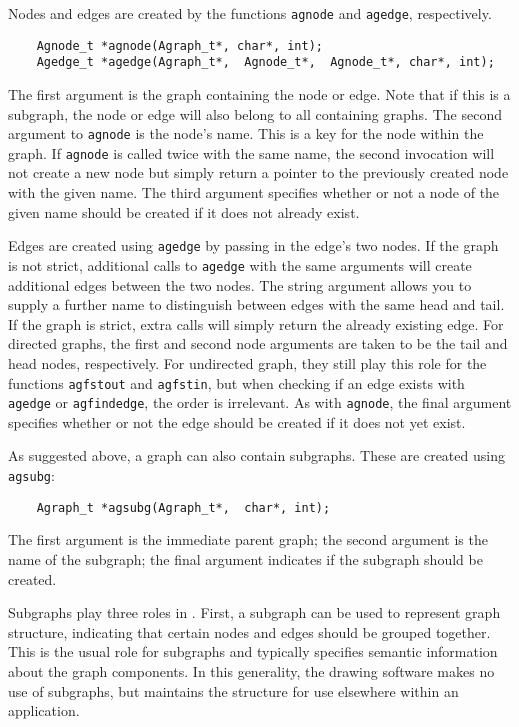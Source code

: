 Nodes and edges are created by the functions {\tt agnode} and
{\tt agedge}, respectively.
\begin{verbatim}
    Agnode_t *agnode(Agraph_t*, char*, int);
    Agedge_t *agedge(Agraph_t*,  Agnode_t*,  Agnode_t*, char*, int);
\end{verbatim}
The first argument is the graph containing the node or edge. Note
that if this is a subgraph, the node or edge will also belong to
all containing graphs. The second argument to {\tt agnode} is the
node's name. This is a key for the node within the graph. If
{\tt agnode} is called twice with the same name, the second invocation
will not create a new node but simply return a pointer to the previously
created node with the given name. The third argument specifies whether or not
a node of the given name should be created if it does not already exist.

Edges are created using {\tt agedge} by passing in the edge's two nodes.
If the graph is not strict, additional calls to {\tt agedge} with
the same arguments will create additional edges between the two nodes.
The string argument allows you to supply a further name to distinguish between
edges with the same head and tail.
If the graph is strict, extra calls will simply return the already existing
edge.
For directed graphs, the first and
second node arguments are taken to be the tail and head
nodes, respectively. For undirected graph, they still play this role
for the functions {\tt agfstout} and {\tt agfstin}, but when checking
if an edge exists with {\tt agedge} or {\tt agfindedge}, the order is
irrelevant. As with {\tt agnode}, the final argument specifies whether or not
the edge should be created if it does not yet exist.

As suggested above, a graph can also contain subgraphs. These are
created using {\tt agsubg}:
\begin{verbatim}
    Agraph_t *agsubg(Agraph_t*,  char*, int);
\end{verbatim}
The first argument is the immediate parent graph; the second argument
is the name of the subgraph; the final argument indicates if the subgraph should
be created. 

Subgraphs play three roles in \gviz.
First, a subgraph can be used to represent graph structure, indicating that
certain nodes and edges should be grouped together. This is the usual
role for subgraphs and typically specifies semantic information about
the graph components. In this generality, the drawing software makes
no use of subgraphs, but maintains the structure for use elsewhere
within an application. 

